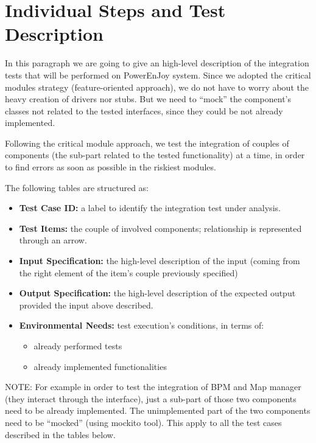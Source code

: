 \documentclass[english]{article}
\begin{document}
\section{Individual Steps and Test Description}

 In this paragraph we are going to give an high-level description of the integration tests that will be performed on PowerEnJoy system.
Since we adopted the critical modules strategy (feature-oriented approach), we do not have to worry about the heavy creation of drivers nor stubs. But we need to ``mock''  the component's classes not related to the tested interfaces, since they could be not already implemented. 
\par Following the critical module approach, we test the integration of couples of components (the sub-part related to the tested functionality) at a time, in order to find errors as soon as possible in the riskiest modules.

\par The following tables are structured as:
\begin{itemize}
\item{ \textbf{Test Case ID:} a label to identify the integration test under analysis.}
\item{ \textbf{Test Items:} the couple of involved components;  relationship is represented through an arrow.}
\item{ \textbf{Input Specification:} the high-level description of the input (coming from
the right element of the item's couple previously specified)}
\item{ \textbf{Output Specification:} the high-level description of the expected output
provided the input above described.}
\item{ \textbf{Environmental Needs:} test execution's conditions, in terms of:
 \begin{itemize}
 \item{already performed tests}
 \item{already implemented functionalities}
 \end{itemize}}
\end{itemize}

\par NOTE:  For example in order to test the integration of BPM and Map manager (they interact through the  interface), just a sub-part of those two components need to be already implemented. The unimplemented part of the two components need to be ``mocked'' (using mockito tool).  This apply to all the test cases described in the tables below.
			
\end{document}
